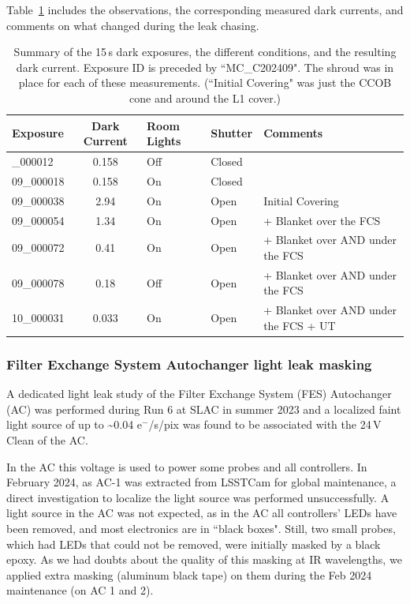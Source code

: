 Table~\ref{tab:leak_chasing} includes the observations, the corresponding measured dark
currents, and comments on what changed during the leak chasing.

\begin{longtable}{|l|c|l|l|l|}
\caption{Summary of the 15\,s dark exposures, the different conditions, and the resulting dark current.
Exposure ID is preceded by ``MC\_C202409".  The shroud was in place for each of these measurements.  (``Initial Covering" was just the CCOB cone and around the L1 cover.) \label{tab:leak_chasing}} \\
\hline
\textbf{Exposure} & \textbf{Dark Current} & \textbf{Room Lights} &\textbf{Shutter} & \textbf{Comments} \\

\hline
\endfirsthead
\hline
\hline
\endhead
\hline
\endfoot
\hline
09\_000012 & 0.158 & Off & Closed & \\
09\_000018 & 0.158 & On & Closed & \\
09\_000038 & 2.94 & On & Open & Initial Covering  \\
09\_000054 & 1.34 & On & Open &  + Blanket over the FCS \\
09\_000072 & 0.41 & On & Open &  + Blanket over AND under the FCS \\
09\_000078 & 0.18 & Off & Open & + Blanket over AND under the FCS \\
10\_000031 & 0.033 & On & Open &  + Blanket over AND under the FCS + UT \\

\end{longtable}


\subsubsection{Filter Exchange System Autochanger light leak
masking}\label{successful-autochanger-light-leaks-masking}

A dedicated light leak study of the Filter Exchange System (FES) Autochanger (AC) was performed during Run 6 at SLAC
in summer 2023 and a localized faint light source of up to
\textasciitilde{}0.04 e$^-$/s/pix was found to be associated with the 24\,V Clean of
the AC.

In the AC this voltage is used to power some probes and all
controllers. In February 2024, as AC-1 was extracted from LSSTCam for
global maintenance, a direct investigation to localize the light
source was performed unsuccessfully. A light source in the AC
was not expected, as in the AC all controllers' LEDs have
been removed, and most electronics are in ``black boxes". Still, two small
probes, which had LEDs that could not be removed, were initially masked
by a black epoxy. As we had doubts about the quality of this masking at
IR wavelengths, we applied extra masking (aluminum black tape) on them during
the Feb 2024 maintenance (on AC 1 and 2).

